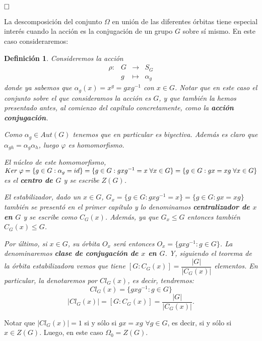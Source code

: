 \documentclass[12pt]{article}
\newtheorem{definition}[theorem]{Definición}
\begin{document}
$\hfill \square$

La descomposición del conjunto $\Omega$ en unión de las diferentes órbitas tiene especial interés cuando la acción es la conjugación de un grupo $G$ sobre sí mismo. En este caso consideraremos: 

\begin{definition}\label{eq:accConj} Consideremos la acción $$\begin{array}{rccl}
\rho\colon &G& \longrightarrow &S_G\\
&g& \longmapsto &\alpha_{g}
\end{array}
$$
donde ya sabemos que $\alpha_{g}(x) = x^{g}=gxg^{-1}$ con $x \in G$. Notar que en este caso el conjunto sobre el que consideramos la acción es $G$, y que también la hemos presentado antes, al comienzo del capítulo concretamente, como la \textbf{acción conjugación}.

Como $\alpha_{g} \in Aut(G)$ tenemos que en particular es biyectiva. Además es claro que $\alpha_{gh}=\alpha_{g}\alpha_{h}$, luego $\varphi$ es homomorfismo.

El núcleo de este homomorfismo, $Ker \hspace{0.1cm} \varphi = \lbrace g \in G: \alpha_{g} = id \rbrace = \lbrace g \in G: gxg^{-1} = x \hspace{0.1cm} \forall x \in G \rbrace =  \lbrace g \in G: gx = xg \hspace{0.1cm} \forall x \in G \rbrace$ es el \textbf{centro de $G$} y se escribe \textbf{$Z(G)$}.

El estabilizador, dado un $x \in G$, $G_{x}= \lbrace g \in G: gxg^{-1} = x \rbrace = \lbrace g \in G: gx=xg \rbrace$ también se presentó en el primer capítulo y lo denominamos \textbf{centralizador de $x$ en $G$} y se escribe como \textbf{$C_{G}(x)$}. Además, ya que $G_{x} \leq G$ entonces también $C_{G}(x) \leq G$.

Por último, si $x \in G$, su órbita $O_{x}$ será entonces $O_{x} = \lbrace gxg^{-1}:g \in G \rbrace$. La denominaremos \textbf{clase de conjugación de $x$ en $G$}. Y, siguiendo el teorema de la órbita estabilizadora vemos que tiene $[G:C_{G}(x)] = \dfrac{|G|}{|C_{G}(x)|}$ elementos. En particular, la denotaremos por $Cl_{G}(x)$, es decir, tendremos: $$Cl_{G}(x) = \lbrace gxg^{-1} : g \in G \rbrace$$ $$|Cl_{G}(x)| = [G :C_G(x)] = \dfrac{|G|}{|C_G(x)|}.$$
\end{definition}

Notar que $|Cl_G(x) | = 1$ si y sólo si $gx = xg$ $\forall g \in G$, es decir, si y sólo si $x \in Z(G)$. Luego, en este caso $\Omega_0 = Z(G).$
\end{document}
